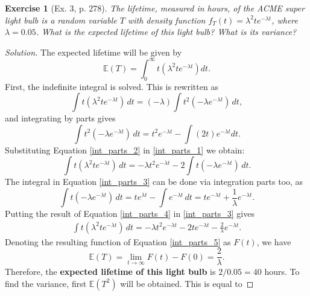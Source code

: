 \documentclass[letterpaper, 10 pt, conference]{article}
\newtheorem{ex}{Exercise}
\newcommand\E{\ensuremath{\mathbb{E}}}
\begin{document}
\begin{ex}[Ex. 3, p. 278]
	The lifetime, measured in hours, of the ACME super light bulb is a random variable $T$ with density function $f_T (t) = \lambda^2 t e^{-\lambda t}$, where $\lambda = 0.05$. What is the expected lifetime of this light bulb? What is its variance?
\end{ex}
\begin{proof}[Solution]
	The expected lifetime will be given by
	\begin{equation}
		\E(T) = \int_{0}^{\infty} t (\lambda^2 t e ^{-\lambda t}) dt.
	\end{equation}
First, the indefinite integral is solved. This is rewritten as
	\begin{equation} \label{int_parts_1}
		\int t (\lambda^2 t e ^{-\lambda t}) \, dt = (-\lambda) \int t^2 (-\lambda e ^{-\lambda t}) \, dt,
	\end{equation}
	and integrating by parts gives
	\begin{equation} \label{int_parts_2}
		\int t^2 (-\lambda e ^{-\lambda t}) \, dt = t^2 e^{-\lambda t} - \int (2t) e^{-\lambda t} dt.
	\end{equation}
	Substituting Equation \ref{int_parts_2} in \ref{int_parts_1} we obtain:
	\begin{equation}\label{int_parts_3}
			\int t (\lambda^2 t e ^{-\lambda t}) \, dt = -\lambda t^2 e^{-\lambda t} - 2 \int t (-\lambda e^{-\lambda t}) \, dt.
	\end{equation}
	The integral in Equation \ref{int_parts_3} can be done via integration parts too, as
	\begin{equation} \label{int_parts_4}
		\int t (-\lambda e^{- \lambda t} ) \, dt = t e^{\lambda t} - \int e^{-\lambda t} \, dt
		= t e^{- \lambda t} + \frac{1}{\lambda} e^{-\lambda t}.
	\end{equation}
	Putting the result of Equation \ref{int_parts_4} in \ref{int_parts_3} gives
	\begin{align}\label{int_parts_5}
		\int t (\lambda^2 t e ^{-\lambda t}) \, dt = -\lambda t^2 e^{-\lambda t} - 2 t e^{-\lambda t} - \frac{2}{\lambda} e^{-\lambda t}.
	\end{align}
	Denoting the resulting function of Equation \ref{int_parts_5} as $F(t)$, we have 
	\begin{equation}
		\E(T) = \lim_{t \longrightarrow \infty} F(t) - F(0) = \frac{2}{\lambda}.
	\end{equation}
	Therefore, the\textbf{ expected lifetime of this light bulb} is $2/0.05 = 40$ hours. To find the variance, first $\E(T^2)$ will be obtained. This is equal to 

\end{proof}
\end{document}
